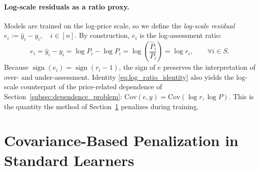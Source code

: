 \documentclass[12pt]{article}
\theoremstyle{plain}
\theoremstyle{definition}
\newcommand{\1}{\mathbf{1}}
\newcommand{\Cov}{\text{Cov}}
\begin{document}

\paragraph{Log-scale residuals as a ratio proxy.} Models are trained on the log-price scale, so we define the \emph{log-scale residual}
$
e_i := \hat y_i - y_i, \quad i\in[n].
$
By construction, $e_i$ is the log-assessment ratio:
\begin{equation}
\label{eq:log_ratio_identity}
e_i
=
\hat y_i-y_i
=
\log \widehat P_i-\log P_i
=
\log\!\left(\frac{\widehat P_i}{P_i}\right)
=
\log r_i,
\qquad \forall i\in S.
\end{equation}
Because $\operatorname{sign}(e_i)=\operatorname{sign}(r_i-1)$, the sign of $e$ preserves the interpretation of over- and under-assessment. Identity \eqref{eq:log_ratio_identity} also yields the log-scale counterpart of the price-related dependence of Section~\ref{subsec:dependence_problem}: $\Cov(e,y)=\Cov(\log r,\log P)$. This is the quantity the method of Section~\ref{sec:covariance_penalty_learning_in_learners} penalizes during training.




\section{Covariance-Based Penalization in Standard Learners}
\label{sec:covariance_penalty_learning_in_learners}

\end{document}
